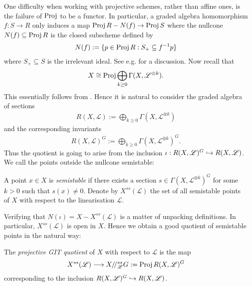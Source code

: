 \documentclass[12pt]{ociamthesis}  %
\begin{document}
One difficulty when working with projective schemes, rather
than affine ones, is the failure of $\operatorname{Proj}$ to be a functor. In particular,
a graded algebra homomorphism $f : S \to R$ only induces a map
$\operatorname{Proj} R - N(f) \to \operatorname{Proj} S$ where the nullcone $N(f)\subseteq\operatorname{Proj} R$ is the closed
subscheme defined by
\begin{align*}
  N(f) := \{ p \in \operatorname{Proj} R : S_+ \subseteq f^{-1}p\}
\end{align*}
where $S_+\subseteq S$ is the irrelevant ideal. See e.g.
\cite[Remark 13.7]{gortz2010} for a discussion. Now recall that
\begin{align*}
  X \cong \operatorname{Proj}\bigoplus_{k\geq 0}\Gamma(X,\mathscr L^{\otimes k}).
\end{align*}
This essentially follows from \cite[Proposition 13.48]{gortz2010}. Hence
it is natural to consider the graded algebra of sections
\begin{align*}
  R(X,\mathscr L) := \bigoplus_{k\geq 0}\Gamma(X,\mathscr L^{\otimes k})
\end{align*}
and the corresponding invariants
\begin{align*}
  R(X,\mathscr L)^G := \bigoplus_{k\geq 0}\Gamma(X,\mathscr L^{\otimes k})^G.
\end{align*}
Thus the quotient is going to arise from the inclusion
$\iota : R(X,\mathscr L)^G\hookrightarrow R(X,\mathscr L)$. We call the points outside the nullcone
semistable:

\begin{definition}
  A point $x\in X$ is \emph{semistable} if there exists a section
  $s\in\Gamma(X,\mathscr L^{\otimes k})^G$ for some $k>0$ such that $s(x)\neq 0$.
  Denote by $X^{ss}(\mathscr L)$ the set of all semistable points of $X$
  with respect to the linearisation $\mathscr L$.
\end{definition}

Verifying that $N(\iota) = X - X^{ss}(\mathscr L)$ is a matter of unpacking definitions.
In particular, $X^{ss}(\mathscr L)$ is open in $X$. Hence we obtain a good quotient
of semistable points in the natural way:

\begin{definition}
  The \emph{projective GIT quotient} of $X$ with respect to $\mathscr L$ is the map
  \begin{align*}
    X^{ss}(\mathscr L) \longrightarrow X /\!/^{ss}_{\mathscr L} G := \operatorname{Proj} R(X,{\mathscr L})^G
  \end{align*}
  corresponding to the inclusion $R(X,{\mathscr L})^G\hookrightarrow R(X,{\mathscr L})$.
\end{definition}
\end{document}
